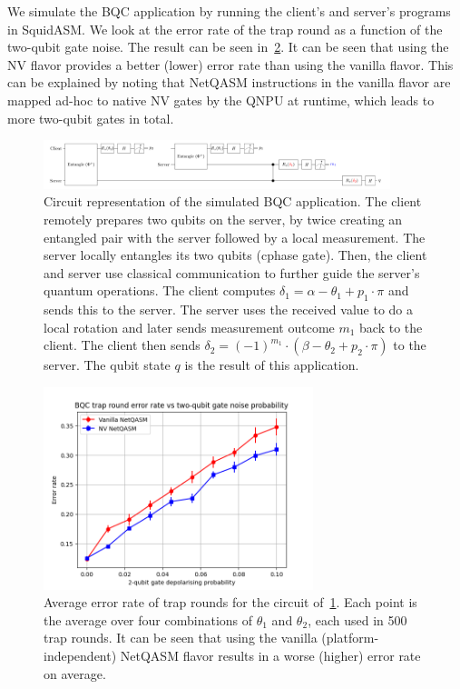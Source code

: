 We simulate the BQC application by running the client's and server's programs in SquidASM.
We look at the error rate of the trap round as a function of the two-qubit gate noise.
The result can be seen in~\cref{netqasm:fig:plot_bqc}.
It can be seen that using the NV flavor provides a better (lower) error rate than using the vanilla flavor.
This can be explained by noting that \ac{NetQASM} instructions in the vanilla flavor are mapped ad-hoc to native NV gates by the \ac{QNPU} at runtime, which leads to more two-qubit gates in total.


\begin{figure}[t]
  \centering
  \includegraphics[width=0.9\textwidth]{figures/netqasm/bqc_app.png}
  \caption{Circuit representation of the simulated BQC application. The client
    remotely prepares two qubits on the server, by twice creating an
    entangled pair with the server followed by a local measurement. The
    server locally entangles its two qubits (cphase gate). Then, the client
    and server use classical communication to further guide the server's
    quantum operations. The client computes $\delta_1 = \alpha - \theta_1 +
      p_1 \cdot \pi$ and sends this to the server. The server uses the
    received value to do a local rotation and later sends measurement
    outcome $m_1$ back to the client. The client then sends $\delta_2 =
      (-1)^{m_1} \cdot (\beta - \theta_2 + p_2 \cdot \pi)$ to the server.
    The qubit state $q$ is the result of this application.
  }
  \label{netqasm:fig:bqc_app}
\end{figure}


\begin{figure}[t]
  \centering
  \includegraphics[width=0.7\textwidth]{figures/netqasm/plots/bqc_sweep_gate_noise_trap.png}
  \caption{
    Average error rate of trap rounds for the circuit of~\cref{netqasm:fig:bqc_app}.
    Each point is the average over four combinations of $\theta_1$ and $\theta_2$,
    each used in 500 trap rounds. It can be seen that using the vanilla (platform-independent)
    \ac{NetQASM} flavor results in a worse (higher) error rate on average.}
  \label{netqasm:fig:plot_bqc}
\end{figure}

